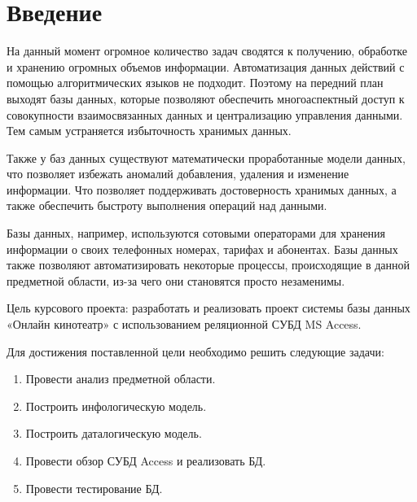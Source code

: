 \section*{Введение}\label{sec:introduction}




На данный момент огромное количество задач сводятся к получению, обработке и хранению огромных объемов информации. Автоматизация данных действий с помощью алгоритмических языков не подходит. Поэтому на передний план выходят базы данных, которые позволяют обеспечить многоаспектный доступ к совокупности взаимосвязанных данных и централизацию управления данными. Тем самым устраняется избыточность хранимых данных.

Также у баз данных существуют математически проработанные модели данных, что позволяет избежать аномалий добавления, удаления и изменение информации. Что позволяет поддерживать достоверность хранимых данных, а также обеспечить быстроту выполнения операций над данными.

Базы данных, например, используются сотовыми операторами для хранения информации о своих телефонных номерах, тарифах и абонентах. Базы данных также позволяют автоматизировать некоторые процессы, происходящие в данной предметной области, из-за чего они становятся просто незаменимы.

Цель курсового проекта: разработать и реализовать проект системы базы данных «Онлайн кинотеатр» с использованием реляционной СУБД MS Access.

Для достижения поставленной цели необходимо решить следующие задачи:
\begin{enumerate}
    \item Провести анализ предметной области.
    \item Построить инфологическую модель.
    \item Построить даталогическую модель.
    \item Провести обзор СУБД Access и реализовать БД.
    \item Провести тестирование БД.
\end{enumerate}


\newpage